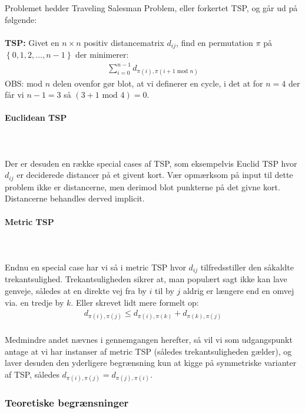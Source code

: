 Problemet hedder Traveling Salesman Problem, eller forkertet TSP, og går ud på følgende:\\
~\\
\textbf{TSP:} Givet en $n \times n$ positiv distancematrix $d_{ij}$, find en permutation $\pi$ på $\left\lbrace 0,1,2,\hdots,n-1 \right\rbrace$ der minimerer:
\begin{align*}
 \sum_{i=0}^{n-1} d_{\pi(i), \pi(i+1 \text{ mod } n)}
\end{align*}
OBS: mod $n$ delen ovenfor gør blot, at vi definerer en cycle, i det at for $n=4$ der får vi $n-1=3$ så $(3+1 \text{ mod } 4)=0$.

\paragraph{Euclidean TSP}
~\\
~\\
Der er desuden en række special cases af TSP, som eksempelvis Euclid TSP hvor $d_{ij}$ er deciderede distancer på et givent kort. Vær opmærksom på input til dette problem ikke er distancerne, men derimod blot punkterne på det givne kort. Distancerne behandles derved implicit.\\

\paragraph{Metric TSP}
~\\
~\\
Endnu en special case har vi så i metric TSP hvor $d_{ij}$ tilfredsstiller den såkaldte trekantsulighed. Trekantsuligheden sikrer at, man populært sagt ikke kan lave genveje, således at en direkte vej fra by $i$ til by $j$ aldrig er længere end en omvej via. en tredje by $k$. Eller skrevet lidt mere formelt op:
\begin{align*}
 d_{\pi(i),\pi(j)} \leq d_{\pi(i),\pi(k)} + d_{\pi(k),\pi(j)}
\end{align*}
~\\
Medmindre andet nævnes i gennemgangen herefter, så vil vi som udgangspunkt antage at vi har instanser af metric TSP (således trekantsuligheden gælder), og laver desuden den yderligere begrænsning kun at kigge på symmetriske varianter af TSP, således $d_{\pi(i),\pi(j)} = d_{\pi(j),\pi(i)}$.


\subsubsection{Teoretiske begrænsninger}

